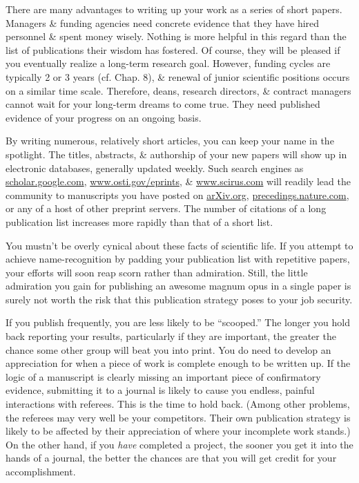 \documentclass{article}
\begin{document}
\begin{enumerate}
\begin{itemize}
\begin{itemize}
			There are many advantages to writing up your work as a series of short papers. Managers \& funding agencies need concrete evidence that they have hired personnel \& spent money wisely. Nothing is more helpful in this regard than the list of publications their wisdom has fostered. Of course, they will be pleased if you eventually realize a long-term research goal. However, funding cycles are typically 2 or 3 years (cf. Chap. 8), \& renewal of junior scientific positions occurs on a similar time scale. Therefore, deans, research directors, \& contract managers cannot wait for your long-term dreams to come true. They need published evidence of your progress on an ongoing basis.
			
			By writing numerous, relatively short articles, you can keep your name in the spotlight. The titles, abstracts, \& authorship of your new papers will show up in electronic databases, generally updated weekly. Such search engines as \url{scholar.google.com}, \url{www.osti.gov/eprints},
			\& \url{www.scirus.com} will readily lead the community to manuscripts you have posted on \url{arXiv.org}, \url{precedings.nature.com}, or any of a host of other preprint servers. The number of citations of a long publication list increases more rapidly than that of a short list.
			
			You mustn't be overly cynical about these facts of scientific life. If you attempt to achieve name-recognition by padding your publication list with repetitive papers, your efforts will soon reap scorn rather than admiration. Still, the little admiration you gain for publishing an awesome magnum opus in a single paper is surely not worth the risk that this publication strategy poses to your job security.
			
			If you publish frequently, you are less likely to be ``scooped.'' The longer you hold back reporting your results, particularly if they are important, the greater the chance some other group will beat you into print. You do need to develop an appreciation for when a piece of work is complete enough to be written up. If the logic of a manuscript is clearly missing an important piece of confirmatory evidence, submitting it to a journal is likely to cause you endless, painful interactions with referees. This is the time to hold back. (Among other problems, the referees may very well be your competitors. Their own publication strategy is likely to be affected by their appreciation of where your incomplete work stands.) On the other hand, if you \textit{have} completed a project, the sooner you get it into the hands of a journal, the better the chances are that you will get credit for your accomplishment.
			

\end{itemize}
\end{itemize}
\end{enumerate}
\end{document}

